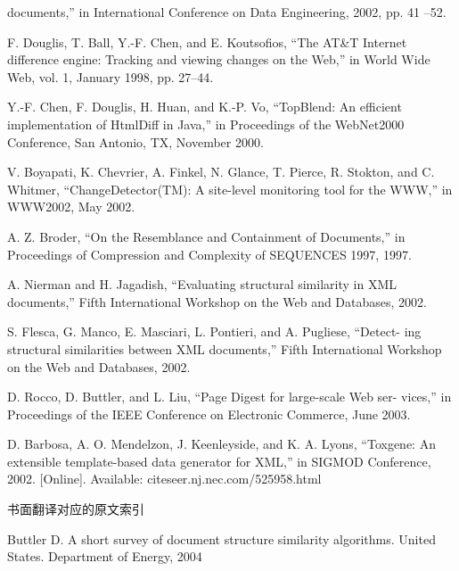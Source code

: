 \begin{spacing}{0.9}
\begin{enumerate}[{[}1{]}]
{  documents,” in International Conference on Data Engineering, 2002, pp. 41
  –52.}
\item{\small F. Douglis, T. Ball, Y.-F. Chen, and E. Koutsofios, “The AT\&T Internet
  difference engine: Tracking and viewing changes on the Web,” in World Wide
  Web, vol. 1, January 1998, pp. 27–44.}
\item{\small Y.-F. Chen, F. Douglis, H. Huan, and K.-P. Vo, “TopBlend: An efficient
  implementation of HtmlDiff in Java,” in Proceedings of the WebNet2000
  Conference, San Antonio, TX, November 2000.}
\item{\small V. Boyapati, K. Chevrier, A. Finkel, N. Glance, T. Pierce, R. Stokton, and
  C. Whitmer, “ChangeDetector(TM): A site-level monitoring tool for the WWW,”
  in WWW2002, May 2002.}
\item{\small A. Z. Broder, “On the Resemblance and Containment of Documents,” in
  Proceedings of Compression and Complexity of SEQUENCES 1997, 1997.}
\item{\small A. Nierman and H. Jagadish, “Evaluating structural similarity in XML
  documents,” Fifth International Workshop on the Web and Databases, 2002.}
\item{\small S. Flesca, G. Manco, E. Masciari, L. Pontieri, and A. Pugliese, “Detect-
  ing structural similarities between XML documents,” Fifth International
  Workshop on the Web and Databases, 2002.}
\item{\small D. Rocco, D. Buttler, and L. Liu, “Page Digest for large-scale Web ser-
  vices,” in Proceedings of the IEEE Conference on Electronic Commerce, June
  2003.}
\item{\small D. Barbosa, A. O. Mendelzon, J. Keenleyside, and K. A. Lyons, “Toxgene:
  An extensible template-based data generator for XML,” in SIGMOD Conference,
  2002. [Online]. Available: citeseer.nj.nec.com/525958.html}
\end{enumerate}  
\end{spacing}
\vspace{20pt}
\begin{center}
  书面翻译对应的原文索引
\end{center}
\setlength{\baselineskip}{17pt}
  {\wuhao Buttler D. A short survey of document structure
    similarity algorithms. United States. Department of Energy, 2004}

